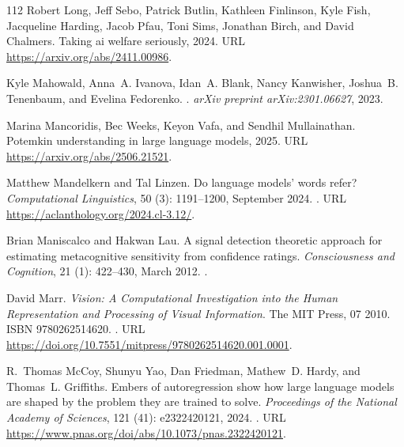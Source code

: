 \begin{thebibliography}{112}
Robert Long, Jeff Sebo, Patrick Butlin, Kathleen Finlinson, Kyle Fish, Jacqueline Harding, Jacob Pfau, Toni Sims, Jonathan Birch, and David Chalmers.
\newblock Taking ai welfare seriously, 2024.
\newblock URL \url{https://arxiv.org/abs/2411.00986}.

Kyle Mahowald, Anna~A. Ivanova, Idan~A. Blank, Nancy Kanwisher, Joshua~B. Tenenbaum, and Evelina Fedorenko.
.
\newblock \emph{arXiv preprint arXiv:2301.06627}, 2023.

Marina Mancoridis, Bec Weeks, Keyon Vafa, and Sendhil Mullainathan.
\newblock Potemkin understanding in large language models, 2025.
\newblock URL \url{https://arxiv.org/abs/2506.21521}.

Matthew Mandelkern and Tal Linzen.
\newblock Do language models' words refer?
\newblock \emph{Computational Linguistics}, 50 (3): 1191--1200, September 2024.
\newblock {}.
\newblock URL \url{https://aclanthology.org/2024.cl-3.12/}.

Brian Maniscalco and Hakwan Lau.
\newblock A signal detection theoretic approach for estimating metacognitive sensitivity from confidence ratings.
\newblock \emph{Consciousness and Cognition}, 21 (1): 422--430, March 2012.
\newblock {}.

David Marr.
\newblock \emph{Vision: A Computational Investigation into the Human Representation and Processing of Visual Information}.
\newblock The MIT Press, 07 2010.
\newblock ISBN 9780262514620.
\newblock {}.
\newblock URL \url{https://doi.org/10.7551/mitpress/9780262514620.001.0001}.

R.~Thomas McCoy, Shunyu Yao, Dan Friedman, Mathew~D. Hardy, and Thomas~L. Griffiths.
\newblock Embers of autoregression show how large language models are shaped by the problem they are trained to solve.
\newblock \emph{Proceedings of the National Academy of Sciences}, 121 (41): e2322420121, 2024{}.
\newblock {}.
\newblock URL \url{https://www.pnas.org/doi/abs/10.1073/pnas.2322420121}.


\end{thebibliography}
